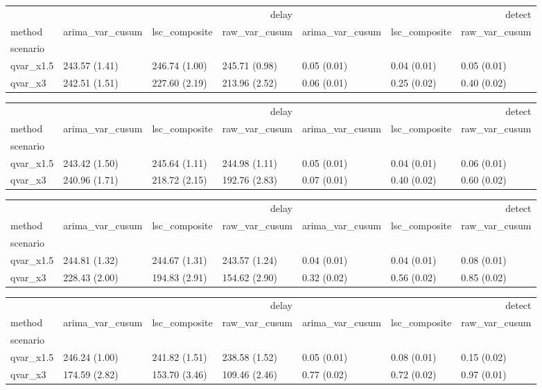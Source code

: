 \begin{tabular}{lllllll}
\toprule
 & \multicolumn{3}{r}{delay} & \multicolumn{3}{r}{detect} \\
method & arima_var_cusum & lsc_composite & raw_var_cusum & arima_var_cusum & lsc_composite & raw_var_cusum \\
scenario &  &  &  &  &  &  \\
\midrule
qvar_x1.5 & 243.57 (1.41) & 246.74 (1.00) & 245.71 (0.98) & 0.05 (0.01) & 0.04 (0.01) & 0.05 (0.01) \\
qvar_x3 & 242.51 (1.51) & 227.60 (2.19) & 213.96 (2.52) & 0.06 (0.01) & 0.25 (0.02) & 0.40 (0.02) \\
\bottomrule
\end{tabular}

\begin{tabular}{lllllll}
\toprule
 & \multicolumn{3}{r}{delay} & \multicolumn{3}{r}{detect} \\
method & arima_var_cusum & lsc_composite & raw_var_cusum & arima_var_cusum & lsc_composite & raw_var_cusum \\
scenario &  &  &  &  &  &  \\
\midrule
qvar_x1.5 & 243.42 (1.50) & 245.64 (1.11) & 244.98 (1.11) & 0.05 (0.01) & 0.04 (0.01) & 0.06 (0.01) \\
qvar_x3 & 240.96 (1.71) & 218.72 (2.15) & 192.76 (2.83) & 0.07 (0.01) & 0.40 (0.02) & 0.60 (0.02) \\
\bottomrule
\end{tabular}

\begin{tabular}{lllllll}
\toprule
 & \multicolumn{3}{r}{delay} & \multicolumn{3}{r}{detect} \\
method & arima_var_cusum & lsc_composite & raw_var_cusum & arima_var_cusum & lsc_composite & raw_var_cusum \\
scenario &  &  &  &  &  &  \\
\midrule
qvar_x1.5 & 244.81 (1.32) & 244.67 (1.31) & 243.57 (1.24) & 0.04 (0.01) & 0.04 (0.01) & 0.08 (0.01) \\
qvar_x3 & 228.43 (2.00) & 194.83 (2.91) & 154.62 (2.90) & 0.32 (0.02) & 0.56 (0.02) & 0.85 (0.02) \\
\bottomrule
\end{tabular}

\begin{tabular}{lllllll}
\toprule
 & \multicolumn{3}{r}{delay} & \multicolumn{3}{r}{detect} \\
method & arima_var_cusum & lsc_composite & raw_var_cusum & arima_var_cusum & lsc_composite & raw_var_cusum \\
scenario &  &  &  &  &  &  \\
\midrule
qvar_x1.5 & 246.24 (1.00) & 241.82 (1.51) & 238.58 (1.52) & 0.05 (0.01) & 0.08 (0.01) & 0.15 (0.02) \\
qvar_x3 & 174.59 (2.82) & 153.70 (3.46) & 109.46 (2.46) & 0.77 (0.02) & 0.72 (0.02) & 0.97 (0.01) \\
\bottomrule
\end{tabular}

